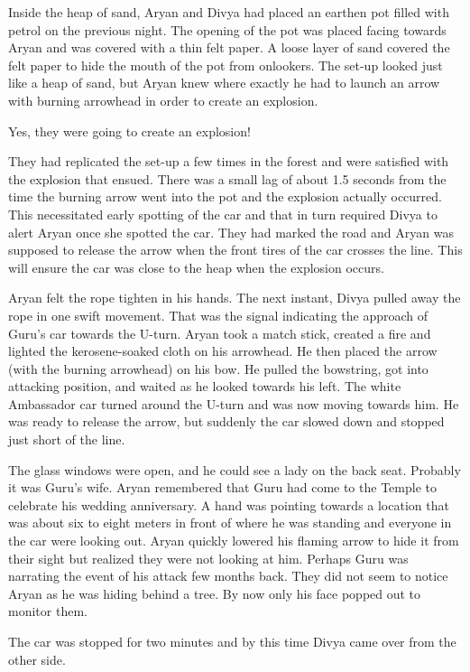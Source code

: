 Inside the heap of sand, Aryan and Divya had placed an earthen pot filled with
petrol on the previous night. The opening of the pot was placed facing
towards Aryan and was covered with a thin felt paper. A loose layer of sand
covered the felt paper to hide the mouth of the pot from onlookers. The set-up
looked just like a heap of sand, but Aryan knew where exactly he had to launch an
arrow with burning arrowhead in order to create an explosion.

Yes, they were going to create an explosion!

They had replicated the set-up a few times in the forest and were satisfied with
the explosion that ensued. There was a small lag of about 1.5 seconds from the
time the burning arrow went into the pot and the explosion actually occurred.
This necessitated early spotting of the car and that in turn required Divya to
alert Aryan once she spotted the car. They had marked the road and Aryan was
supposed to release the arrow when the front tires of the car crosses the line.
This will ensure the car was close to the heap when the explosion occurs.

Aryan felt the rope tighten in his hands. The next instant, Divya pulled away
the rope in one swift movement. That was the signal indicating the approach of
Guru's car towards the U-turn. Aryan took a match stick, created a fire and
lighted the kerosene-soaked cloth on his arrowhead. He then placed the arrow
(with the burning arrowhead) on his bow. He pulled the bowstring, got into
attacking position, and waited as he looked towards his left. The white
Ambassador car turned around the U-turn and was now moving towards him. He was
ready to release the arrow, but suddenly the car slowed down and stopped just
short of the line.

The glass windows were open, and he could see a lady on the back seat. Probably
it was Guru's wife. Aryan remembered that Guru had come to the Temple to
celebrate his wedding anniversary. A hand was pointing towards a location that
was about six to eight meters in front of where he was standing and everyone in
the car were looking out. Aryan quickly lowered his flaming arrow to hide it
from their sight but realized they were not looking at him. Perhaps Guru was
narrating the event of his attack few months back. They did not seem to notice
Aryan as he was hiding behind a tree. By now only his face popped out to monitor
them.

The car was stopped for two minutes and by this time Divya came over from the
other side.

